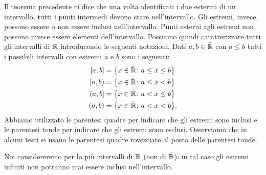 Il teorema precedente ci dice che una volta identificati i due estermi
di un intervallo, tutti i punti intermedi devono stare nell'intervallo.
Gli estremi, invece, possono essere o non essere inclusi nell'intervallo.
Punti esterni agli estremi non possono invece essere elementi dell'intervallo.
Possiamo quindi caratterizzare tutti gli intervalli di $\mathbb R$
introducendo le seguenti notazioni. Dati $a,b\in \bar {\mathbb R}$ con $a\le b$
tutti i possibili intervalli con estremi $a$ e $b$ sono i seguenti:
\begin{equation}\label{eq:499494}
\begin{aligned}
[a,b] &= \ENCLOSE{x\in \bar \RR\colon a \le x \le b} \\
[a,b) &= \ENCLOSE{x\in \bar \RR\colon a \le x < b} \\
(a,b] &= \ENCLOSE{x\in \bar \RR\colon a < x \le b}\\
(a,b) &= \ENCLOSE{x\in \bar \RR\colon a < x < b}.
\end{aligned}
\end{equation}
Abbiamo utilizzato le parentesi quadre per indicare che gli estremi
sono inclusi e le parentesi tonde per indicare che gli estremi sono esclusi.
Osserviamo che in alcuni testi si usano le parentesi quadre rovesciate al posto
delle parentesi tonde.

Noi considereremo per lo più intervalli di $\mathbb R$ (non di $\bar {\mathbb R}$): in tal
caso gli estremi infiniti non potranno mai essere inclusi nell'intervallo.

\begin{comment}
Finora abbiamo sempre supposto $a \le b$.
Se invece $a>b$ potremmo definire per convenzione:
\begin{equation}\label{eq:488364}
  [a,b] = [b,a], \quad
  [a,b) = (b,a], \quad
  (a,b] = [b,a), \quad
  (a,b) = (b,a).
\end{equation}
Si faccia però attenzione che in altri testi gli intervalli con gli estremi
scambiati non vengono definiti oppure vengono considerati vuoti.

La convenzione può essere utile perché in generale se $\vec a, \vec b$ sono
elementi di uno spazio vettoriale reale $V$ allora ha senso
definire:
\begin{align*}
    [\vec a,\vec b] &= \ENCLOSE{(1-t)\vec a + t \vec b\colon t\in [0,1]},\\
    [\vec a,\vec b) &= \ENCLOSE{(1-t)\vec a + t \vec b\colon t\in [0,1)},\\
    (\vec a,\vec b] &= \ENCLOSE{(1-t)\vec a + t \vec b\colon t\in (0,1]},\\
    (\vec a,\vec b) &= \ENCLOSE{(1-t)\vec a + t \vec b\colon t\in (0,1)}.
\end{align*}
L'intervallo $[\vec a,\vec b]$ è quindi il segmento di estremi
$\vec a$ e $\vec b$ e può essere definito anche se sullo spazio
vettoriale non è dato un ordinamento.
Ma questo rimane coerente con la definizione~\eqref{eq:499494}
data sopra solamente se adottiamo la convenzione~\eqref{eq:488364}.
\end{comment}

